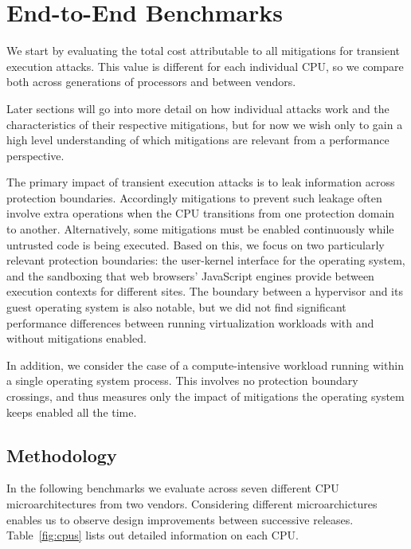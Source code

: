 \section{End-to-End Benchmarks}
\label{s:benchmarks}

We start by evaluating the total cost attributable to all mitigations for transient execution attacks.
This value is different for each individual CPU, so we compare both across generations of processors and between vendors.

Later sections will go into more detail on how individual attacks work and the characteristics of their respective mitigations, but for now we wish only to gain a high level understanding of which mitigations are relevant from a performance perspective.

The primary impact of transient execution attacks is to leak information across protection boundaries.
Accordingly mitigations to prevent such leakage often involve extra operations when the CPU transitions from one protection domain to another.
Alternatively, some mitigations must be enabled continuously while untrusted code is being executed.
Based on this, we focus on two particularly relevant protection boundaries: the user-kernel interface for the operating system, and the sandboxing that web browsers' JavaScript engines provide between execution contexts for different sites.
The boundary between a hypervisor and its guest operating system is also notable, but we did not find significant performance differences between running virtualization workloads with and without mitigations enabled.

In addition, we consider the case of a compute-intensive workload running within a single operating system process.
This involves no protection boundary crossings, and thus measures only the impact of mitigations the operating system keeps enabled all the time.

\subsection{Methodology}
In the following benchmarks we evaluate across seven different CPU microarchitectures from two vendors.
Considering different microarchictures enables us to observe design improvements between successive releases.
Table~\ref{fig:cpus} lists out detailed information on each CPU.

